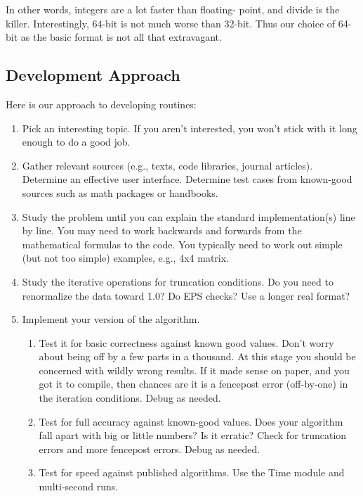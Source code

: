 In other words, integers are a lot faster than floating-
point, and divide is the killer.  Interestingly, 64-bit is
not much worse than 32-bit.  Thus our choice of 64-bit as
the basic format is not all that extravagant.


\subsection{Development Approach}
Here is our approach to developing routines:
\begin{enumerate}
     \item Pick an interesting topic.  If you aren't
     interested, you won't stick with it long enough to do a
     good job.
     
     \item Gather relevant sources (e.g., texts, code
     libraries, journal articles).  Determine an effective
     user interface.  Determine test cases from known-good
     sources such as math packages or handbooks.
     
     \item Study the problem until you can explain the standard
     implementation(s) line by line.  You may need to work
     backwards and forwards from the mathematical formulas
     to the code.  You typically need to work out simple
     (but not too simple) examples, e.g., 4x4 matrix.
     
     \item Study the iterative operations for truncation
     conditions.  Do you need to renormalize the data toward
     1.0?  Do EPS checks?  Use a longer real format?
     
     \item Implement your version of the algorithm.
     \begin{enumerate}
          \item Test it for basic correctness against known
          good values.  Don't worry about being off by a few
          parts in a thousand.  At this stage you should be
          concerned with wildly wrong results.  If it made
          sense on paper, and you got it to compile, then
          chances are it is a fencepost error (off-by-one)
          in the iteration conditions.  Debug as needed.
          
          \item Test for full accuracy against known-good
          values.  Does your algorithm fall apart with big
          or little numbers?  Is it erratic?  Check for
          truncation errors and more fencepost errors.
          Debug as needed.
          
          \item Test for speed against published algorithms.
          Use the Time module and multi-second runs.
       \end{enumerate}
\end{enumerate}

